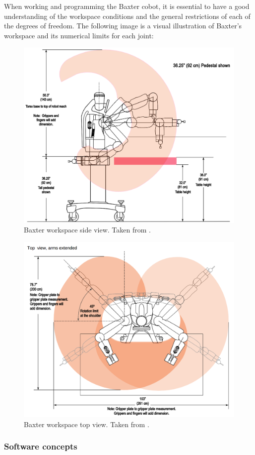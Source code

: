 \documentclass[11pt]{report} %
\begin{document}
When working and programming the Baxter cobot, it is essential to have a good understanding of the workspace conditions and the general restrictions of each of the degrees of freedom. The following image is a visual illustration of Baxter's workspace and its numerical limits for each joint:

\begin{figure}[H]
    \centering
    \includegraphics[width=0.65\linewidth]{assets/imgs/reference_framework/baxter_workspace_side_view.png}
    \caption{Baxter workspace side view. Taken from \citep{cite_baxter_workspace_from_sdk_wiki}.} 
    \label{fig_baxter_workspace_1}
\end{figure}

\begin{figure}[H]
    \centering
    \includegraphics[width=0.65\linewidth]{assets/imgs/reference_framework/baxter_workspace_top_view.png}
    \caption{Baxter workspace top view. Taken from \citep{cite_baxter_workspace_from_sdk_wiki}.} 
    \label{fig_baxter_workspace_2}
\end{figure}


\subsubsection{Software concepts}
\end{document}
